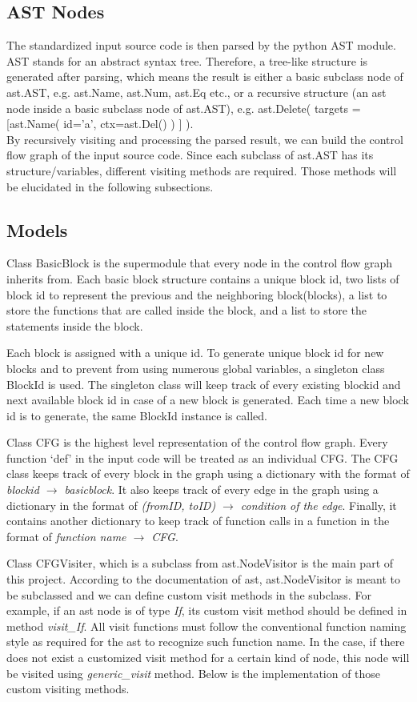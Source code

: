 \documentclass[11pt]{article}
\begin{document}
\subsection{AST Nodes}
The standardized input source code is then parsed by the python AST module. AST stands for an abstract syntax tree. Therefore, a tree-like structure is generated after parsing, which means the result is either a basic subclass node of ast.AST, e.g. ast.Name, ast.Num, ast.Eq etc., or a recursive structure (an ast node inside a basic subclass node of ast.AST), e.g. ast.Delete( targets = [ast.Name( id='a', ctx=ast.Del() ) ] ). \\
By recursively visiting and processing the parsed result, we can build the control flow graph of the input source code. Since each subclass of ast.AST has its structure/variables, different visiting methods are required. Those methods will be elucidated in the following subsections.

\subsection{Models}
Class BasicBlock is the supermodule that every node in the control flow graph inherits from. Each basic block structure contains a unique block id, two lists of block id to represent the previous and the neighboring block(blocks), a list to store the functions that are called inside the block, and a list to store the statements inside the block.

Each block is assigned with a unique id. To generate unique block id for new blocks and to prevent from using numerous global variables, a singleton class BlockId is used. The singleton class will keep track of every existing blockid and next available block id in case of a new block is generated. Each time a new block id is to generate, the same BlockId instance is called.

Class CFG is the highest level representation of the control flow graph. Every function `def' in the input code will be treated as an individual CFG. The CFG class keeps track of every block in the graph using a dictionary with the format of \textit{blockid $\rightarrow$ basicblock}. It also keeps track of every edge in the graph using a dictionary in the format of \textit{(fromID, toID) $\rightarrow$ condition of the edge}. Finally, it contains another dictionary to keep track of function calls in a function in the format of \textit{function name $\rightarrow$ CFG}.

Class CFGVisiter, which is a subclass from ast.NodeVisitor is the main part of this project. According to the documentation of ast, ast.NodeVisitor is meant to be subclassed and we can define custom visit methods in the subclass. For example, if an ast node is of type \textit{If}, its custom visit method should be defined in method \textit{visit\_If}. All visit functions must follow the conventional function naming style as required for the ast to recognize such function name. In the case, if there does not exist a customized visit method for a certain kind of node, this node will be visited using \textit{generic\_visit} method. Below is the implementation of those custom visiting methods.
\end{document}
